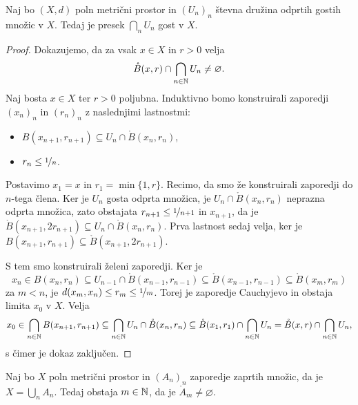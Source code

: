 
\begin{izrek}[Baire]
  Naj bo $(X, d)$ poln metrični prostor in $(U_n)_n$ števna družina odprtih
  gostih množic v $X$.
  Tedaj je presek $\bigcap_n U_n$ gost v $X$.
\end{izrek}

\begin{proof}
  Dokazujemo, da za vsak $x \in X$ in $r > 0$ velja
  \[
	\mathring{B}(x, r) \cap \bigcap_{n \in \mathbb{N}} U_n \ne \varnothing.
  \]
  Naj bosta $x \in X$ ter $r > 0$ poljubna.
  Induktivno bomo konstruirali zaporedji $(x_n)_n$ in $(r_n)_n$ z naslednjimi
  lastnostmi:
  \begin{itemize}
  \item $B(x_{n+1}, r_{n+1}) \subseteq U_n \cap \mathring{B}(x_n, r_n)$,
  \item $r_n \le \nicefrac{1}{n}$.
  \end{itemize}
  Postavimo $x_1 = x$ in $r_1 = \min\{1, r\}$.
  Recimo, da smo že konstruirali zaporedji do $n$-tega člena.
  Ker je $U_n$ gosta odprta množica, je $U_n \cap \mathring{B}(x_n, r_n)$
  neprazna odprta množica, zato obstajata $r_{n+1} \le \nicefrac{1}{n+1}$ in
  $x_{n+1}$, da je $\mathring{B}(x_{n+1}, 2r_{n+1}) \subseteq U_n \cap
  \mathring{B}(x_n, r_n)$.
  Prva lastnost sedaj velja, ker je $B(x_{n+1}, r_{n+1}) \subseteq
  \mathring{B}(x_{n+1}, 2 r_{n+1})$.

  S tem smo konstruirali želeni zaporedji.
  Ker je
  \[
	x_n \in B(x_n, r_n) \subseteq U_{n-1} \cap \mathring{B}(x_{n-1}, r_{n-1})
	\subseteq \mathring{B}(x_{n-1}, r_{n-1}) \subseteq \mathring{B}(x_m, r_m)
  \]
  za $m < n$, je $d(x_m, x_n) \le r_m \le \nicefrac{1}{m}$.
  Torej je zaporedje Cauchyjevo in obstaja limita $x_0$ v $X$.
  Velja
  \[
	x_0 \in \bigcap_{n \in \mathbb{N}} B(x_{n+1}, r_{n+1})
	\subseteq \bigcap_{n \in \mathbb{N}} U_n \cap \mathring{B}(x_n, r_n)
	\subseteq \mathring{B}(x_1, r_1) \cap \bigcap_{n \in \mathbb{N}} U_n
	= \mathring{B}(x, r) \cap \bigcap_{n \in \mathbb{N}} U_n,
  \]
  s čimer je dokaz zaključen.
\end{proof}


\begin{posledica}
  Naj bo $X$ poln metrični prostor in $(A_n)_n$ zaporedje zaprtih množic, da je
  $X = \bigcup_n A_n$.
  Tedaj obstaja $m \in \mathbb{N}$, da je $\mathring{A}_m \ne \varnothing$.
\end{posledica}

